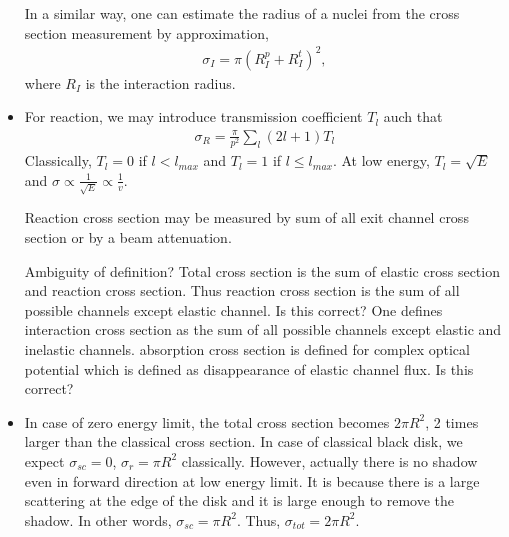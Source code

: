 \documentclass[11pt]{book}
\newcommand{\bea}{\begin{eqnarray}}
\newcommand{\eea}{\end{eqnarray}}
\begin{document}
\begin{itemize}
	   In a similar way, one can estimate the radius of a nuclei from the cross section measurement 
	   by approximation,
	   \bea 
	   \sigma_I= \pi (R_I^p +R_I^t)^2,
	   \eea       
	   where $R_I$ is the interaction radius. 
	         
	\item For reaction, we may introduce transmission coefficient $T_l$ auch that 
	  \bea
	  \sigma_R=\frac{\pi}{p^2}\sum_{l} (2l+1) T_l
	  \eea    
	  Classically, $T_l=0$ if $l< l_{max}$ and $T_l=1$ if $l\leq l_{max}$. 
	  At low energy, $T_l=\sqrt{E}$ and $\sigma \propto \frac{1}{\sqrt{E}}\propto \frac{1}{v} $.
	  
	  Reaction cross section may be measured by sum of all exit channel cross section
	  or by a beam attenuation. 
	  
	  { \color{red} Ambiguity of definition?} Total cross section is the sum of elastic cross section and reaction cross section.
	  Thus {\color{red}reaction cross section} is the sum of all possible channels except elastic channel. Is this correct? 
	  One defines {\color{red}interaction cross section} as the sum of all possible channels except elastic and inelastic channels.  {\color{red} absorption cross section} is defined for complex optical potential which is defined as
	  disappearance of elastic channel flux.  Is this correct?
	  
	 \item In case of zero energy limit, the total cross section becomes $2\pi R^2$, 2 times larger than the classical 
	  cross section. In case of classical black disk, we expect $\sigma_{sc}=0$, $\sigma_{r}=\pi R^2$ classically.
	  However, actually there is no shadow even in forward direction at low energy limit. It is because
	  there is a large scattering at the edge of the disk and it is large enough to remove the shadow.
	  In other words, $\sigma_{sc}=\pi R^2$. Thus, $\sigma_{tot}=2\pi R^2$.  
	  

\end{itemize}
\end{document}
